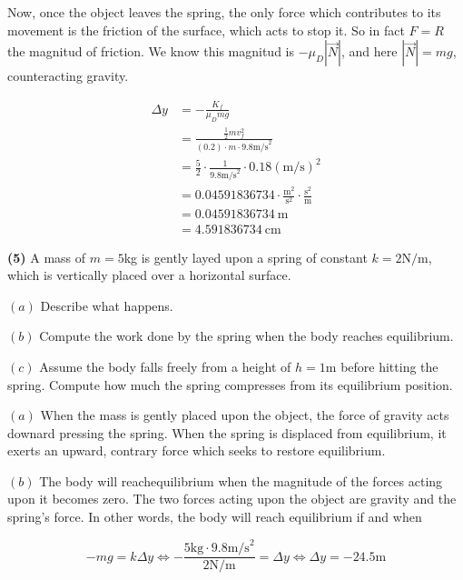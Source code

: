 \documentclass[12pt]{article}
\theoremstyle{definition}
\begin{document}
Now, once the object leaves the spring, the only force which contributes to its
movement is the friction of the surface, which acts to stop it. So in fact $F =
R$ the magnitud of friction. We know this magnitud is $-\mu_D \left| \vec{N}
\right| $, and here $\left| \vec{N} \right| = mg$, counteracting gravity.

\begin{align*}
    \Delta y 
    &= - \frac{K_f}{\mu_D m g} \\ 
    &= \frac{\frac{1}{2} m v_f^2}{(0.2) \cdot m \cdot 9.8 \text{m/s}^2} \\ 
    &= \frac{5}{2} \cdot \frac{1}{9.8 \text{m/s}^2} \cdot 0.18( \text{m/s} )^2 \\ 
    &= 0.04591836734 \cdot \frac{\text{m}^2}{\text{s}^2} \cdot
    \frac{\text{s}^2}{\text{m}} \\ 
    &= 0.04591836734 ~ \text{m} \\ 
    &= 4.591836734~ \text{cm}
\end{align*}


\pagebreak 

\begin{shaded}
    \textbf{(5)} A mass of $m = 5$kg is gently layed upon a spring of constant
    $k = 2 \text{N/m}$, which is vertically placed over a horizontal surface. 

    $(a)$ Describe what happens. 

    $(b)$ Compute the work done by the spring when the body reaches equilibrium. 

    $(c)$ Assume the body falls freely from a height of $h = 1\text{m}$ before
    hitting the spring. Compute how much the spring compresses from its
    equilibrium position.
\end{shaded}

$(a)$ When the mass is gently placed upon the object, the force of gravity acts
downard pressing the spring. When the spring is displaced from equilibrium, it
exerts an upward, contrary force which seeks to restore equilibrium. 

$(b)$ The body will reachequilibrium when the magnitude of the forces acting
upon it becomes zero. The two forces acting upon the object are gravity and 
the spring's force. In other words, the body will reach equilibrium if and when 

\begin{equation*}
    -mg = k \Delta y \iff -\frac{5 \text{kg} \cdot 9.8 \text{m/s}^2}{2 \text{N/m}}
    = \Delta y \iff \Delta y = -24.5 \text{m}
\end{equation*}
\end{document}
